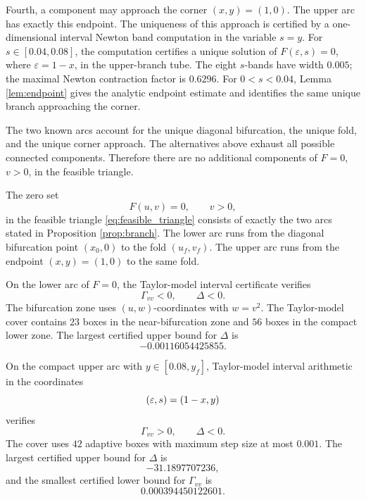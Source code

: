 Fourth, a component may approach the corner \((x,y)=(1,0)\).  The upper arc
has exactly this endpoint.  The uniqueness of this approach is certified by a
one-dimensional interval Newton band computation in the variable
\(s=y\).  For \(s\in[0.04,0.08]\), the computation certifies a unique solution
of \(F(\varepsilon,s)=0\), where \(\varepsilon=1-x\), in the upper-branch tube.
The eight \(s\)-bands have width \(0.005\); the maximal Newton contraction
factor is \(0.6296\).  For \(0<s<0.04\), Lemma \ref{lem:endpoint} gives the
analytic endpoint estimate and identifies the same unique branch approaching
the corner.

The two known arcs account for the unique diagonal bifurcation, the unique
fold, and the unique corner approach.  The alternatives above exhaust all
possible connected components.  Therefore there are no additional components
of \(F=0\), \(v>0\), in the feasible triangle.

\begin{proposition}\label{prop:A6}
The zero set
\[
  F(u,v)=0,
  \qquad
  v>0,
\]
in the feasible triangle \eqref{eq:feasible_triangle} consists of exactly the
two arcs stated in Proposition \ref{prop:branch}.  The lower arc runs from the
diagonal bifurcation point \((x_0,0)\) to the fold \((u_f,v_f)\).  The upper
arc runs from the endpoint \((x,y)=(1,0)\) to the same fold.
\end{proposition}

\begin{proposition}\label{prop:A7}
On the lower arc of \(F=0\), the Taylor-model interval certificate verifies
\begin{equation}\label{eq:lower_det_app}
  \Gamma_{vv}<0,
  \qquad
  \Delta<0.
\end{equation}
The bifurcation zone uses \((u,w)\)-coordinates with \(w=v^2\).  The
Taylor-model cover contains \(23\) boxes in the near-bifurcation zone and
\(56\) boxes in the compact lower zone.  The largest certified upper bound for
\(\Delta\) is
\begin{equation}\label{eq:lower_margin_app}
  -0.00116054425855.
\end{equation}
\end{proposition}

\begin{proposition}\label{prop:A8}
On the compact upper arc with \(y\in[0.08,y_f]\), Taylor-model interval
arithmetic in the coordinates
\[
  (\varepsilon,s)=(1-x,y)
\]
verifies
\begin{equation}\label{eq:upper_det_app}
  \Gamma_{vv}>0,
  \qquad
  \Delta<0.
\end{equation}
The cover uses \(42\) adaptive boxes with maximum step size at most \(0.001\).
The largest certified upper bound for \(\Delta\) is
\begin{equation}\label{eq:upper_margin_app}
  -31.1897707236,
\end{equation}
and the smallest certified lower bound for \(\Gamma_{vv}\) is
\begin{equation}\label{eq:upper_gvv_margin_app}
  0.000394450122601.
\end{equation}
\end{proposition}

